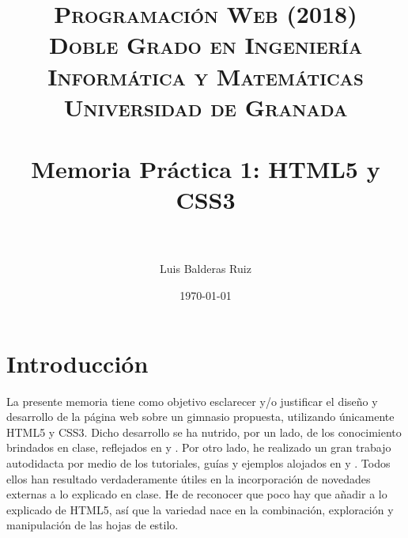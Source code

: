 


\title{	
\normalfont \normalsize 
\textsc{\textbf{Programación Web (2018)} \\ Doble Grado en Ingeniería Informática y Matemáticas \\ Universidad de Granada} \\ [25pt] %
\horrule{0.5pt} \\[0.4cm] %
\huge Memoria Práctica 1: HTML5 y CSS3 \\ %
\horrule{2pt} \\[0.5cm] %
}

\author{Luis Balderas Ruiz} %

\date{\normalsize\today} %




\maketitle 

\newpage

\tableofcontents

\newpage

\section{Introducción}

La presente memoria tiene como objetivo esclarecer y/o justificar el diseño y desarrollo de la página web sobre un gimnasio propuesta, utilizando únicamente HTML5 y CSS3. Dicho desarrollo se ha nutrido, por un lado, de los conocimiento brindados en clase, reflejados en \cite{html5} y \cite{css}. Por otro lado, he realizado un gran trabajo autodidacta por medio de los tutoriales, guías y ejemplos alojados en \cite{w3sh} y \cite{w3sc}. Todos ellos han resultado verdaderamente útiles en la incorporación de novedades externas a lo explicado en clase. He de reconocer que poco hay que añadir a lo explicado de HTML5, así que la variedad nace en la combinación, exploración y manipulación de las hojas de estilo. \\

